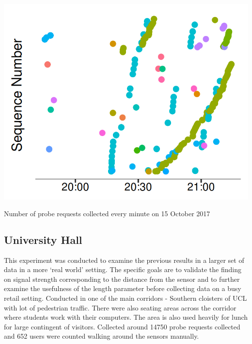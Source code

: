 \begin{marginfigure}[-4cm]
  \forcerectofloat
  \includegraphics{images/home-samsung-google.png}
  \caption{Number of probe requests collected every minute on 15 October 2017}
  \label{figure:collection:home:samsung}
\end{marginfigure}

\subsection{University Hall}
This experiment was conducted to examine the previous results in a larger set of data in a more `real world' setting.
The specific goals are to validate the finding on signal strength corresponding to the distance from the sensor and to further examine the usefulness of the length parameter before collecting data on a busy retail setting.
Conducted in one of the main corridors - Southern cloisters of UCL with lot of pedestrian traffic.
There were also seating areas across the corridor where students work with their computers.
The area is also used heavily for lunch for large contingent of visitors.
Collected around 14750 probe requests collected and 652 users were counted walking around the sensors manually.

